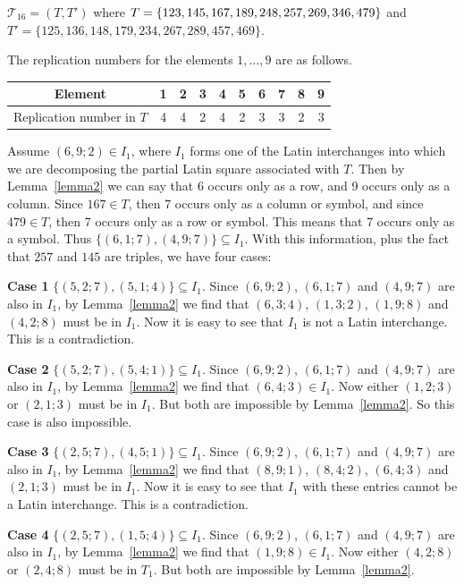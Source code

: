 \documentclass[12pt]{report}
\begin{document}
 ${\mathcal T}_{16}=(T,T')$ 
where $T=\{1 2 3,1 4 5,1 6 7,1 8 9,2 4 8,2 5 7,2 6 9,
3 4 6,\break 4 7 9 \}$ and
$T'=\{1 2 5,1 3 6,1 4 8,1 7 9,2 3 4,2 6 7,2 8 9,4 5 7,4 6 9 \}$.

The replication numbers for the elements $1,\dots, 9$ are as follows. 

\begin{center}
\begin{tabular}{c|c|c|c|c|c|c|c|c|c}
 Element             & 1 & 2 & 3 & 4 & 5 & 6 & 7 & 8 & 9 \\
			  \hline
 Replication  number in $T$ & 4 & 4 & 2 & 4 & 2 & 3 & 3 & 2 & 3
\end{tabular}
\end{center}

Assume $(6, 9; 2)\in I_1$, where $I_1$ forms one of the Latin interchanges
into which we are decomposing the partial Latin square associated 
with $T$. Then by Lemma~\ref{lemma2} we can say that 6 
occurs only as a row, and 9 occurs only
as a column.  Since $167 \in T$, then 7 occurs only as a
column or symbol, and since $479 \in T$, then 7 occurs
only as a row or symbol.  This means that 7 occurs only as a symbol.
Thus $\{ (6, 1; 7), (4, 9; 7) \} \subseteq I_1$.
With this information, plus the fact that $257$ 
and $145$ are triples, we have four cases:

{\bf Case 1}  $\{ (5, 2; 7), (5, 1; 4) \} \subseteq I_1$. Since  
$(6,9;2)$, $(6, 1; 7)$ and $(4, 9; 7)$ are also in $I_1$, by Lemma~\ref{lemma2} we find that $(6,3;4)$, $(1,3;2)$, $(1,9;8)$ and
$(4,2;8)$ must be in $I_1$. Now it is easy to see that $I_1$ is not 
a Latin interchange. This is a contradiction.

{\bf Case 2} $\{ (5, 2; 7), (5, 4; 1) \} \subseteq I_1$.  
Since $(6,9;2)$, $(6, 1; 7)$ and $(4, 9; 7)$ are also in $I_1$, by Lemma~\ref{lemma2} we find that $(6,4;3)\in I_1$. Now either $(1,2;3)$ or
$(2,1;3)$ must be in $I_1$. But both are impossible by Lemma~\ref{lemma2}.  So this case is also impossible.

{\bf Case 3} $\{ (2, 5; 7), (4, 5; 1) \} \subseteq I_1$.  
Since $(6,9;2)$, $(6, 1; 7)$ and $(4, 9; 7)$ are also in $I_1$, by Lemma~\ref{lemma2} we find that $(8,9;1)$, $(8,4;2)$, $(6,4;3)$ and 
$(2,1;3)$ must be in $I_1$. Now it is easy to see that $I_1$ with these
entries cannot be a Latin interchange. This is a contradiction.

{\bf Case 4} $\{ (2, 5; 7), (1, 5; 4) \} \subseteq I_1$. 
Since $(6,9;2)$, $(6, 1; 7)$ and $(4, 9; 7)$ are also in $I_1$, by Lemma~\ref{lemma2} we find that $(1,9;8)\in I_1$. Now either
$(4,2;8)$ or $(2,4;8)$ must be in $T_1$. But both are impossible by
Lemma~\ref{lemma2}.
\end{document}
